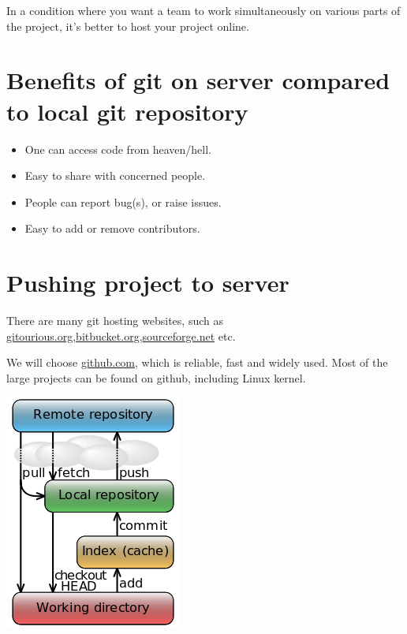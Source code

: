 \documentclass[letterpaper,10pt,english]{sphinxmanual}
\begin{document}
In a condition where you want a team to work simultaneously on various
parts of the project, it's better to host your project online.

\begin{DUlineblock}{0em}
\item[] 
\item[] 
\end{DUlineblock}


\section{Benefits of git on server compared to local git repository}
\label{version-control:benefits-of-git-on-server-compared-to-local-git-repository}\begin{itemize}
\item {} 
One can access code from heaven/hell.

\item {} 
Easy to share with concerned people.

\item {} 
People can report bug(s), or raise issues.

\item {} 
Easy to add or remove contributors.

\end{itemize}

\begin{DUlineblock}{0em}
\item[] 
\item[] 
\end{DUlineblock}


\section{Pushing project to server}
\label{version-control:pushing-project-to-server}
There are many git hosting websites, such as
\href{http://gitorious.org/}{gitourious.org},\href{http://bitbucket.org/}{bitbucket.org},\href{http://sourceforge.net/}{sourceforge.net} etc.

We will choose \href{http://github.com/}{github.com}, which is reliable, fast
and widely used. Most of the large projects can be found on github, including
Linux kernel.

\includegraphics[width=0.500\linewidth]{data_flow.png}
\end{document}
